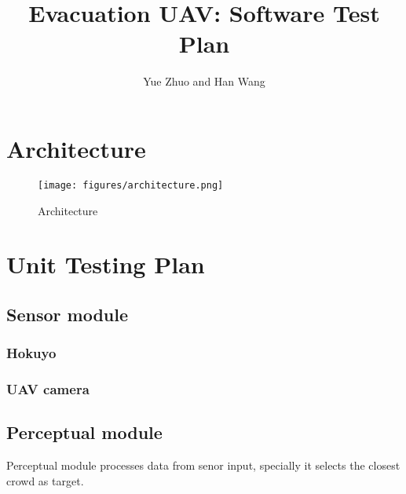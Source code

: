
\usepackage{graphicx}
\usepackage{subfigure}
\usepackage{enumerate}
\usepackage{threeparttable}
\usepackage[colorlinks,linkcolor=red,anchorcolor=blue,citecolor=green]{hyperref}

\title{Evacuation UAV: Software Test Plan}

\author{Yue Zhuo and Han Wang}

\large

\maketitle


 

\section{Architecture}

\begin{figure}[htb]
\centering
\texttt{[image: figures/architecture.png]}
\caption{Architecture}
\label{architecture}
\end{figure}

\section{Unit Testing Plan}

\subsection{Sensor module}
\subsubsection{Hokuyo}

\subsubsection{UAV camera}


\subsection{Perceptual module}
Perceptual module processes data from senor input, specially it selects the closest crowd as target.

